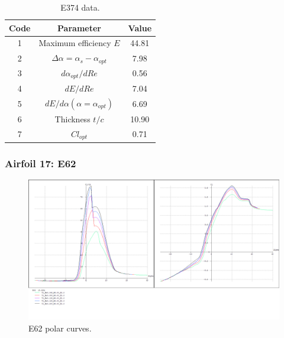 \documentclass[../TFG_Annex.tex]{subfiles}
\begin{document}
\begin{table}[h!]
	\centering
	\begin{tabular}{c|c|c}
		Code & Parameter                                    & Value  \\ \hline
		1    & Maximum efficiency $E$                      &  44.81   \\
		2    & $\Delta \alpha=\alpha_{s}-\alpha_{opt}$    &        7.98         \\
		3    & ${d\alpha_{opt}}/{dRe}$                     &           0.56     \\
		4    & ${dE}/{dRe}$                                &        7.04     \\
		5    & ${dE}/{d \alpha} (\alpha=\alpha_{opt})$      &           6.69        \\
		6    & Thickness $t/c$                            &              10.90      \\
		7    & $Cl_{opt}$  &   0.71
	\end{tabular}
	\caption{E374 data.}
	\label{tab:Airf16}
\end{table}


\newpage
\subsubsection{Airfoil 17: E62}


\begin{figure}[h!]
	\centering
	\includegraphics[width=1\linewidth]{"../../04-Airfoil selection/Imatges airfoils/17-E62"}
	\caption{E62 polar curves.}
	\label{fig:17-E362}
\end{figure}
\end{document}
